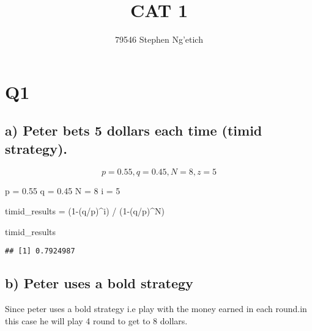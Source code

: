 \documentclass[
]{article}
\title{CAT 1}
\author{79546 Stephen Ng'etich}
\date{}
\newenvironment{Shaded}{\begin{snugshade}}{\end{snugshade}}
\newcommand{\DecValTok}[1]{\textcolor[rgb]{0.00,0.00,0.81}{#1}}
\newcommand{\FloatTok}[1]{\textcolor[rgb]{0.00,0.00,0.81}{#1}}
\newcommand{\NormalTok}[1]{#1}
\newcommand{\OtherTok}[1]{\textcolor[rgb]{0.56,0.35,0.01}{#1}}
\newcommand{\SpecialCharTok}[1]{\textcolor[rgb]{0.00,0.00,0.00}{#1}}
\begin{document}
\maketitle

\hypertarget{q1}{%
\section{Q1}\label{q1}}

\hypertarget{a-peter-bets-5-dollars-each-time-timid-strategy.}{%
\subsection{a) Peter bets 5 dollars each time (timid
strategy).}\label{a-peter-bets-5-dollars-each-time-timid-strategy.}}

\[p=0.55,q=0.45,N=8,z=5\]

\begin{Shaded}
\begin{Highlighting}[]
\NormalTok{p }\OtherTok{=} \FloatTok{0.55}
\NormalTok{q }\OtherTok{=} \FloatTok{0.45}
\NormalTok{N }\OtherTok{=} \DecValTok{8}
\NormalTok{i }\OtherTok{=} \DecValTok{5}

\NormalTok{timid\_results }\OtherTok{=}\NormalTok{ (}\DecValTok{1}\SpecialCharTok{{-}}\NormalTok{(q}\SpecialCharTok{/}\NormalTok{p)}\SpecialCharTok{\^{}}\NormalTok{i) }\SpecialCharTok{/}\NormalTok{ (}\DecValTok{1}\SpecialCharTok{{-}}\NormalTok{(q}\SpecialCharTok{/}\NormalTok{p)}\SpecialCharTok{\^{}}\NormalTok{N)}

\NormalTok{timid\_results}
\end{Highlighting}
\end{Shaded}

\begin{verbatim}
## [1] 0.7924987
\end{verbatim}

\hypertarget{b-peter-uses-a-bold-strategy}{%
\subsection{b) Peter uses a bold
strategy}\label{b-peter-uses-a-bold-strategy}}

Since peter uses a bold strategy i.e play with the money earned in each
round.in this case he will play 4 round to get to 8 dollars.
\end{document}
